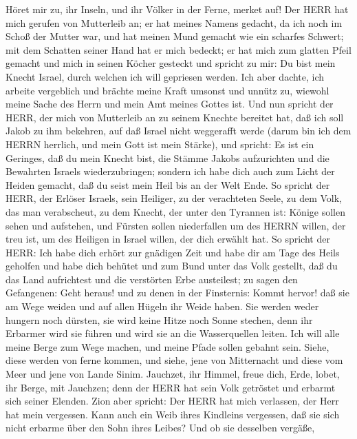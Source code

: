  Höret mir zu, ihr Inseln, und ihr Völker in der Ferne,
merket auf! Der HERR hat mich gerufen von Mutterleib an; er hat meines
Namens gedacht, da ich noch im Schoß der Mutter war,  und
hat meinen Mund gemacht wie ein scharfes Schwert; mit dem Schatten
seiner Hand hat er mich bedeckt; er hat mich zum glatten Pfeil gemacht
und mich in seinen Köcher gesteckt  und spricht zu mir: Du
bist mein Knecht Israel, durch welchen ich will gepriesen werden.
 Ich aber dachte, ich arbeite vergeblich und brächte meine
Kraft umsonst und unnütz zu, wiewohl meine Sache des Herrn und mein Amt
meines Gottes ist.  Und nun spricht der HERR, der mich von
Mutterleib an zu seinem Knechte bereitet hat, daß ich soll Jakob zu ihm
bekehren, auf daß Israel nicht weggerafft werde (darum bin ich dem HERRN
herrlich, und mein Gott ist mein Stärke),  und spricht: Es
ist ein Geringes, daß du mein Knecht bist, die Stämme Jakobs
aufzurichten und die Bewahrten Israels wiederzubringen; sondern ich habe
dich auch zum Licht der Heiden gemacht, daß du seist mein Heil bis an
der Welt Ende.  So spricht der HERR, der Erlöser Israels,
sein Heiliger, zu der verachteten Seele, zu dem Volk, das man
verabscheut, zu dem Knecht, der unter den Tyrannen ist: Könige sollen
sehen und aufstehen, und Fürsten sollen niederfallen um des HERRN
willen, der treu ist, um des Heiligen in Israel willen, der dich erwählt
hat.  So spricht der HERR: Ich habe dich erhört zur gnädigen
Zeit und habe dir am Tage des Heils geholfen und habe dich behütet und
zum Bund unter das Volk gestellt, daß du das Land aufrichtest und die
verstörten Erbe austeilest;  zu sagen den Gefangenen: Geht
heraus! und zu denen in der Finsternis: Kommt hervor! daß sie am Wege
weiden und auf allen Hügeln ihr Weide haben.  Sie werden
weder hungern noch dürsten, sie wird keine Hitze noch Sonne stechen,
denn ihr Erbarmer wird sie führen und wird sie an die Wasserquellen
leiten.  Ich will alle meine Berge zum Wege machen, und
meine Pfade sollen gebahnt sein.  Siehe, diese werden von
ferne kommen, und siehe, jene von Mitternacht und diese vom Meer und
jene von Lande Sinim.  Jauchzet, ihr Himmel, freue dich,
Erde, lobet, ihr Berge, mit Jauchzen; denn der HERR hat sein Volk
getröstet und erbarmt sich seiner Elenden.  Zion aber
spricht: Der HERR hat mich verlassen, der Herr hat mein vergessen.
 Kann auch ein Weib ihres Kindleins vergessen, daß sie sich
nicht erbarme über den Sohn ihres Leibes? Und ob sie desselben vergäße,
